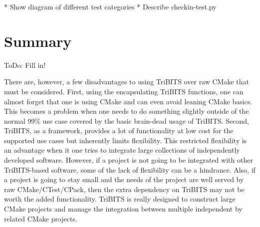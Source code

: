 \documentclass[note]{TechNote}
\begin{document}
* Show diagram of different test categories
* Describe checkin-test.py


%
\section{Summary}
%

ToDo: Fill in!

There are, however, a few disadvantages to using TriBITS over raw CMake that must be considered.  First, using the encapsulating TriBITS functions, one can almost forget that one is using CMake and can even avoid leaning CMake basics.  This becomes a problem when one needs to do something slightly outside of the normal 99\% use case covered by the basic brain-dead usage of TriBITS.  Second, TriBITS, as a framework, provides a lot of functionality at low cost for the supported use cases but inherently limits flexibility.  This restricted flexibility is an advantage when it one tries to integrate large collections of independently developed software.  However, if a project is not going to be integrated with other TriBITS-based software, some of the lack of flexibility can be a hindrance.  Also, if a project is going to stay small and the needs of the project are well served by raw CMake/CTest/CPack, then the extra dependency on TriBITS may not be worth the added functionality.  TriBITS is really designed to construct large CMake projects and manage the integration between multiple independent by related CMake projects.





\closing
\caution
\end{document}
